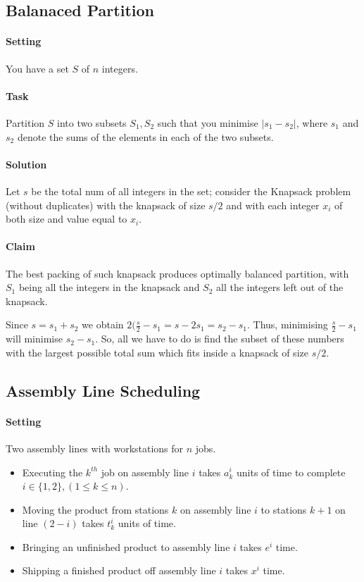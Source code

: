 \subsection{Balanaced Partition}
\paragraph{Setting}
You have a set \(S\) of \(n\) integers.

\paragraph{Task}
Partition \(S\) into two subsets \(S_1, S_2\) such that you minimise \(|s_1-s_2|\), where \(s_1\) and \(s_2\) denote the sums of the elements in each of the two subsets.

\paragraph{Solution}
Let \(s\) be the total num of all integers in the set; consider the Knapsack problem (without duplicates) with the knapsack of size \(s/2\) and with each integer \(x_i\) of both size and value equal to \(x_i\).

\paragraph{Claim}
The best packing of such knapsack produces optimally balanced partition, with \(S_1\) being all the integers in the knapsack and \(S_2\) all the integers left out of the knapsack. 

Since \(s = s_1 + s_2\) we obtain \(2(\frac{s}{2} - s_1 = s - 2s_1 = s_2 - s_1\). Thus, minimising \(\frac{s}{2} - s_1\) will minimise \(s_2 - s_1\). So, all we have to do is find the subset of these numbers with the largest possible total sum which fits inside a knapsack of size \(s/2\). 

\subsection{Assembly Line Scheduling}
\paragraph{Setting}
Two assembly lines with workstations for \(n\) jobs.
\begin{itemize}
    \item Executing the \(k^{th}\) job on assembly line \(i\) takes \(a_k^i\) units of time to complete \(i \in \{1,2\}, (1 \leq k \leq n)\).
    \item Moving the product from stations \(k\) on assembly line \(i\) to stations \(k+1\) on line \((2-i)\) takes \(t_k^i\) units of time.
    \item Bringing an unfinished product to assembly line \(i\) takes \(e^i\) time.
    \item Shipping a finished product off assembly line \(i\) takes \(x^i\) time.
\end{itemize}

